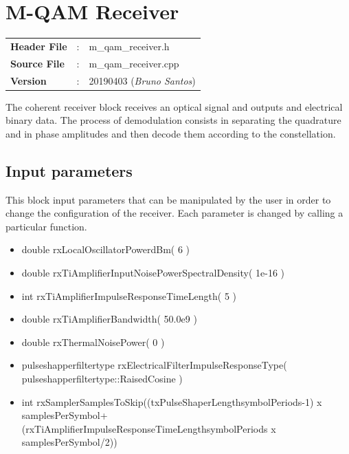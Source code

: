 \clearpage

\section{M-QAM Receiver}\label{lib:homodyneRx}

\begin{tcolorbox}	
	\begin{tabular}{p{2.75cm} p{0.2cm} p{10.5cm}} 	
		\textbf{Header File}   &:& m\_qam\_receiver.h \\
		\textbf{Source File}   &:& m\_qam\_receiver.cpp \\
        \textbf{Version}       &:& 20190403 (\emph{Bruno Santos})\\
	\end{tabular}
\end{tcolorbox}
\bigbreak
The coherent receiver block receives an optical signal and outputs and electrical binary data. The process of demodulation consists in separating the quadrature and in phase amplitudes and then decode them according to the constellation.


\subsection*{Input parameters}

This block input parameters that can be manipulated by the user in
order to change the configuration of the receiver. Each parameter is changed by
calling a
particular function. 
\begin{itemize}
    \item double rxLocalOscillatorPower\textunderscore dBm( 6 )
    \item double rxTiAmplifierInputNoisePowerSpectralDensity( 1e-16 )
    \item int rxTiAmplifierImpulseResponseTimeLength\textunderscore ( 5 )
    \item double rxTiAmplifierBandwidth( 50.0e9 )
    \item double rxThermalNoisePower( 0 )
    \item pulse\textunderscore shapper\textunderscore filter\textunderscore type rxElectricalFilterImpulseResponseType\newline ( pulse\textunderscore shapper\textunderscore filter\textunderscore type::RaisedCosine )
    
    \item int rxSamplerSamplesToSkip((txPulseShaperLength\textunderscore symbolPeriods-1) x samplesPerSymbol+\newline (rxTiAmplifierImpulseResponseTimeLength\textunderscore symbolPeriods x samplesPerSymbol/2))

\end{itemize}

